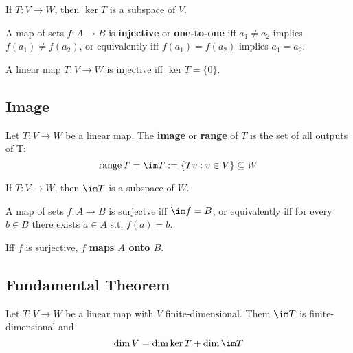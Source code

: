 \begin{theorem} If $T : V \to W$, then $\ker T$ is a subspace of $V$.
\end{theorem}

\begin{definition}[Injective]
  A map of sets $f : A \to B$ is \textbf{injective} or \textbf{one-to-one} iff $a_1 \neq a_2$ implies $f(a_1) \neq f(a_2)$, or equivalently iff $f(a_1) = f(a_2)$ implies $a_1 = a_2$.
\end{definition}

\begin{theorem}
  A linear map $T : V \to W$ is injective iff $\ker T = \{ 0 \}$.
\end{theorem}

\subsection{Image}

\begin{definition}[Image]
  Let $T : V \to W$ be a linear map. The \textbf{image} or \textbf{range} of $T$ is the set of all outputs of T:
  \[
    \operatorname{range} T = \im T := \{ Tv : v \in V \} \subseteq W
  \]
\end{definition}

\begin{theorem} If $T : V \to W$, then $\im T$ is a subspace of $W$.
\end{theorem}

\begin{definition}[Surjective]
  A map of sets $f : A \to B$ is surjectve iff $\im f = B$, or equivalently iff for every $b \in B$ there exists $a \in A$ s.t. $f(a) = b$.

  Iff $f$ is surjective, $f$ \textbf{maps $A$ onto $B$}.
\end{definition}

\subsection{Fundamental Theorem}

\begin{namedtheorem}
  Let $T : V \to W$ be a linear map with $V$ finite-dimensional. Them $\im T$ is finite-dimensional and
  \[
    \dim V = \dim \ker T + \dim \im T
  \]
\end{namedtheorem}

